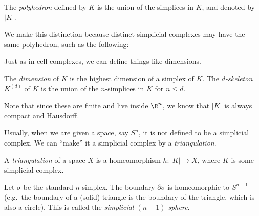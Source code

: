\documentclass[a4paper]{article}
\begin{document}
\begin{defi}[Polyhedron]
  The \emph{polyhedron} defined by $K$ is the union of the simplices in $K$, and denoted by $|K|$.
\end{defi}
We make this distinction because distinct simplicial complexes may have the same polyhedron, such as the following:
\begin{center}
\end{center}
Just as in cell complexes, we can define things like dimensions.
\begin{defi}
  The \emph{dimension} of $K$ is the highest dimension of a simplex of $K$. The \emph{$d$-skeleton} $K^{(d)}$ of $K$ is the union of the $n$-simplices in $K$ for $n \leq d$.
\end{defi}
Note that since these are finite and live inside $\R^n$, we know that $|K|$ is always compact and Hausdorff.

Usually, when we are given a space, say $S^n$, it is not defined to be a simplicial complex. We can ``make'' it a simplicial complex by a \emph{triangulation}.
\begin{defi}[Triangulation]
  A \emph{triangulation} of a space $X$ is a homeomorphism $h: |K| \to X$, where $K$ is some simplicial complex.
\end{defi}

\begin{eg}
  Let $\sigma$ be the standard $n$-simplex. The boundary $\partial \sigma$ is homeomorphic to $S^{n - 1}$ (e.g.\ the boundary of a (solid) triangle is the boundary of the triangle, which is also a circle). This is called the \emph{simplicial $(n - 1)$-sphere}.
\end{eg}
\end{document}
